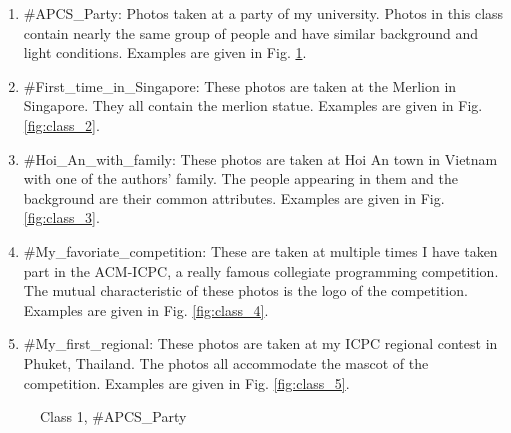 \begin{enumerate}

\item \#APCS\_Party: Photos taken at a party of my university. Photos in this class contain nearly the same group of people and have similar background and light conditions. Examples are given in Fig. \ref{fig:class_1}.
\item \#First\_time\_in\_Singapore: These photos are taken at the Merlion in Singapore. They all contain the merlion statue. Examples are given in Fig. \ref{fig:class_2}.
\item \#Hoi\_An\_with\_family: These photos are taken at Hoi An town in Vietnam with one of the authors' family. The people appearing in them and the background are their common attributes. Examples are given in Fig. \ref{fig:class_3}.
\item \#My\_favoriate\_competition: These are taken at multiple times I have taken part in the ACM-ICPC, a really famous collegiate programming competition. The mutual characteristic of these photos is the logo of the competition. Examples are given in Fig. \ref{fig:class_4}.
\item \#My\_first\_regional: These photos are taken at my ICPC regional contest in Phuket, Thailand. The photos all accommodate the mascot of the competition. Examples are given in Fig. \ref{fig:class_5}.

\end{enumerate}

\begin{figure}
    \centering
    \caption{Class 1, \#APCS\_Party}
    \label{fig:class_1}
\end{figure}


